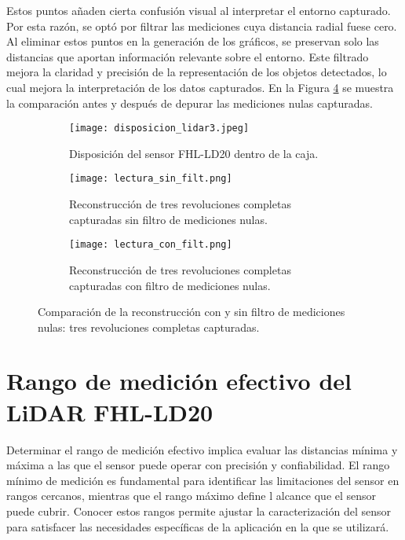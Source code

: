 Estos puntos añaden cierta confusión visual al interpretar el entorno capturado. Por esta razón, se optó por filtrar las mediciones cuya distancia radial fuese cero. Al eliminar estos puntos en la generación de los gráficos, se preservan solo las distancias que aportan información relevante sobre el entorno. Este filtrado mejora la claridad y precisión de la representación de los objetos detectados, lo cual mejora la interpretación de los datos capturados. En la Figura \ref{fig: comparación_con_sin_filt} se muestra la comparación antes y después de depurar las mediciones nulas capturadas.

\begin{figure}[H]
	\centering
	\begin{subfigure}{0.6\textwidth}
		\centering
		\texttt{[image: disposicion\_lidar3.jpeg]}
		\caption{Disposición del sensor FHL-LD20 dentro de la caja.}
		\label{disposicion_lidar3}
		\vspace{1em}
	\end{subfigure}
	\begin{subfigure}{0.45\textwidth}
		\centering
		\texttt{[image: lectura\_sin\_filt.png]}
		\caption{Reconstrucción de tres revoluciones completas capturadas sin filtro de mediciones nulas.}
		\label{lectura_sin_filt}
	\end{subfigure}
	\hspace{1em}
	\begin{subfigure}{0.45\textwidth}
		\centering
		\texttt{[image: lectura\_con\_filt.png]}
		\caption{Reconstrucción de tres revoluciones completas capturadas con filtro de mediciones nulas.}
		\label{lectura_con_filt}
	\end{subfigure}
	\caption{Comparación de la reconstrucción con y sin filtro de mediciones nulas: tres revoluciones completas capturadas.}
	\label{fig: comparación_con_sin_filt}
\end{figure}

\section{Rango de medición efectivo del LiDAR FHL-LD20}
Determinar el rango de medición efectivo implica evaluar las distancias mínima y máxima a las que el sensor puede operar con precisión y confiabilidad. El rango mínimo de medición es fundamental para identificar las limitaciones del sensor en rangos cercanos, mientras que el rango máximo define l alcance que el sensor puede cubrir. Conocer estos rangos permite ajustar la caracterización del sensor para satisfacer las necesidades específicas de la aplicación en la que se utilizará.

